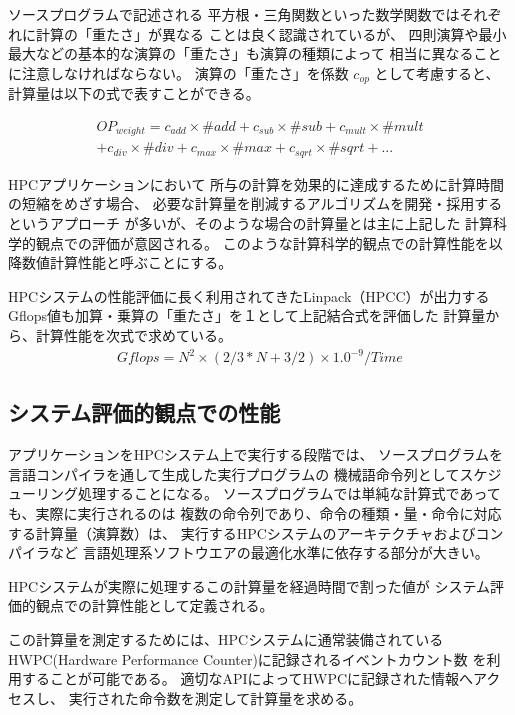 \documentclass[submit,techrep,noauthor]{ipsj}
\begin{document}
ソースプログラムで記述される
平方根・三角関数といった数学関数ではそれぞれに計算の「重たさ」が異なる
ことは良く認識されているが、
四則演算や最小最大などの基本的な演算の「重たさ」も演算の種類によって
相当に異なることに注意しなければならない。
演算の「重たさ」を係数
\begin{math} c_{op} \end{math}
として考慮すると、計算量は以下の式で表すことができる。

\begin{align*}
OP_{weight} =
	c_{add}\times \#add + c_{sub}\times \#sub + c_{mult}\times \#mult \\
	+ c_{div}\times \#div + c_{max}\times \#max + c_{sqrt}\times \#sqrt + ...
\end{align*}

HPCアプリケーションにおいて
所与の計算を効果的に達成するために計算時間の短縮をめざす場合、
必要な計算量を削減するアルゴリズムを開発・採用するというアプローチ
が多いが、そのような場合の計算量とは主に上記した
計算科学的観点での評価が意図される。
このような計算科学的観点での計算性能を以降数値計算性能と呼ぶことにする。

HPCシステムの性能評価に長く利用されてきたLinpack（HPCC）が出力する
Gflops値も加算・乗算の「重たさ」を１として上記結合式を評価した
計算量から、計算性能を次式で求めている。
\begin{align*}
Gflops = N^{2} \times ( 2/3 * N + 3/2 ) \times 1.0^{-9} / Time 
\end{align*}



\subsection {システム評価的観点での性能}
\label{subsection:system-perf}

アプリケーションをHPCシステム上で実行する段階では、
ソースプログラムを言語コンパイラを通して生成した実行プログラムの
機械語命令列としてスケジューリング処理することになる。
ソースプログラムでは単純な計算式であっても、実際に実行されるのは
複数の命令列であり、命令の種類・量・命令に対応する計算量（演算数）は、
実行するHPCシステムのアーキテクチャおよびコンパイラなど
言語処理系ソフトウエアの最適化水準に依存する部分が大きい。

HPCシステムが実際に処理するこの計算量を経過時間で割った値が
システム評価的観点での計算性能として定義される。

この計算量を測定するためには、HPCシステムに通常装備されている
HWPC(Hardware Performance Counter)に記録されるイベントカウント数
を利用することが可能である。
適切なAPIによってHWPCに記録された情報へアクセスし、
実行された命令数を測定して計算量を求める。
\end{document}
